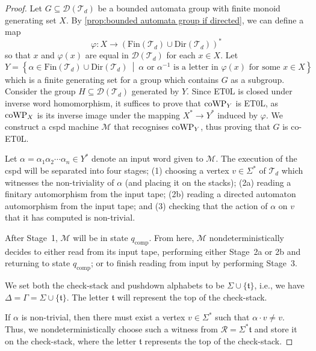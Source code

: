 \begin{proof}
	
	Let $G \subseteq \mathcal{D}(\mathcal{T}_d)$ be a bounded automata group with finite monoid generating set $X$.
	By \cref{prop:bounded automata group if directed}, we can define a map
	\[
	\varphi\colon
	X
	\to
	\left(
	\mathrm{Fin}(\mathcal{T}_d) \cup \mathrm{Dir}(\mathcal{T}_d)
	\right)^*
	\] so that $x$ and $\varphi(x)$ are equal in $\mathcal{D}(\mathcal{T}_d)$ for each $x \in X$.
	Let
	\[
	Y
	=
	\left\{
		\alpha \in \mathrm{Fin}(\mathcal{T}_d) \cup \mathrm{Dir}(\mathcal{T}_d) 
	\ \middle|\ 
		\alpha\text{ or } \alpha^{-1} \text{ is a letter in } \varphi(x) \text{ for some } x \in X
	\right\}
	\] which is a finite generating set for a group which contains $G$ as a subgroup.
	Consider the group $H \subseteq \mathcal{D}(\mathcal{T}_d)$ generated by $Y$.
	Since ET0L is closed under inverse word homomorphism, it suffices to prove that $\mathrm{coWP}_Y$ is ET0L, as $\mathrm{coWP}_X$ is its inverse image under the mapping $X^* \to Y^*$ induced by  $\varphi$.
	We construct a cspd machine $\mathcal{M}$ that recognises $\mathrm{coWP}_Y$, thus proving that $G$ is co-ET0L.
	
	Let $\alpha = \alpha_1 \alpha_2 \cdots \alpha_n \in Y^*$ denote an input word given to $\mathcal{M}$.
	The execution of the cspd will be separated into four stages;
	(1) choosing a vertex $v \in \Sigma^*$ of $\mathcal{T}_d$ which witnesses the non-triviality of $\alpha$ (and placing it on the stacks);
	(2a)  reading a finitary automorphism from the input tape;
	(2b)  reading a directed automaton automorphism from the input tape; and
	(3)  checking that the action of $\alpha$ on $v$ that it has computed is non-trivial.
	
	After Stage~1, $\mathcal{M}$ will be in state $q_\mathrm{comp}$.
	From here, $\mathcal{M}$ nondeterministically decides to either read from its input tape, performing either Stage~2a or 2b and returning to state $q_\mathrm{comp}$; or to finish reading from input by performing Stage~3.
	
	We	set both the check-stack and pushdown alphabets to be $\Sigma \cup \{\mathfrak{t}\}$,
	i.e., we have $\Delta=\Gamma=\Sigma \cup \{\mathfrak{t}\}$.
	The letter $\mathfrak{t}$ will represent the top of the check-stack.
	
	
	If $\alpha$ is non-trivial, then there must exist a vertex $v \in \Sigma^*$ such that $\alpha \cdot v \neq v$.
	Thus, we nondeterministically choose such a witness from $\mathcal{R} = \Sigma^* \mathfrak{t}$ and store it on the check-stack, where the letter $\mathfrak{t}$ represents the top of the check-stack.
	

\end{proof}
